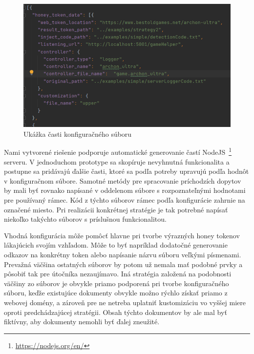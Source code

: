\documentclass[conference, 11pt,slovak,a4paper,twoside]{IEEEtran}
\begin{document}
\begin{figure}[!t]  %
					\begin{center}
									\includegraphics[width=\linewidth]{fig/configurationFile.png}
									\caption{Ukážka časti konfiguračného súboru}
									\label{configurationFile}
					\end{center}
\end{figure}



Nami vytvorené riešenie podporuje automatické generovanie častí NodeJS~\footnote{\url{https://nodejs.org/en/}} serveru. V jednoduchom prototype sa skopíruje nevyhnutná funkcionalita a postupne sa pridávajú ďalšie časti, ktoré sa podľa potreby upravujú podľa hodnôt v konfiguračnom súbore. Samotné metódy pre spracovanie príchodzích dopytov by mali byť rovnako napísané v oddelenom súbore s rozpoznateľnými hodnotami pre používaný rámec. Kód z týchto súborov rámec podľa konfigurácie zahrnie na označené miesto. Pri realizácii konkrétnej stratégie je tak potrebné napísať niekoľko takýchto súborov s príslušnou funkcionalitou. 

Vhodná konfigurácia môže pomôcť hlavne pri tvorbe výrazných honey tokenov lákajúcich svojím vzhľadom. Môže to byť napríklad dodatočné generovanie odkazov na konkrétny token alebo napísanie názvu súboru veľkými písmenami. Prevažná väčšina ostatných súborov by potom už nemala mať podobné prvky a pôsobiť tak pre útočníka nezaujímavo. Iná stratégia založená na podobnosti väčšiny zo súborov je obvykle priamo podporená pri tvorbe konfiguračného súboru, keďže existujúce dokumenty obvykle možno rýchlo získať priamo z webovej domény, a zároveň pre ne netreba uplatniť kustomizáciu vo vyššej miere oproti predchádzajúcej stratégii. Obsah týchto dokumentov by ale mal byť fiktívny, aby dokumenty nemohli byť ďalej zneužité.
\end{document}
